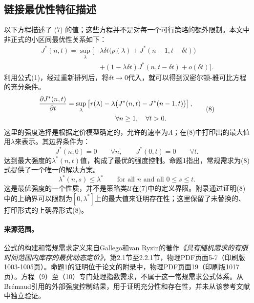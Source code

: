\documentclass{article}
\begin{document}
\subsection*{链接最优性特征描述}
以下方程描述了 (7) 的值；这些方程并不是对每一个可行策略的额外限制。本文中非正式的小区间最优性关系如下：
\[
\begin{aligned}
J^*(n,t)=\sup_\lambda\bigl[&\lambda\delta t
 \bigl(p(\lambda)+J^*(n-1,t-\delta t)\bigr)\\
 &+(1-\lambda\delta t)J^*(n,t-\delta t)+o(\delta t)\bigr].
\end{aligned}
\]
利用公式(1)，经过重新排列后，将$\delta t\to0$代入，就可以得到汉密尔顿-雅可比方程的充分条件。
\begin{equation}
\begin{aligned}
\frac{\partial J^*(n,t)}{\partial t}
 &=\sup_\lambda\left[r(\lambda)-\lambda\bigl(J^*(n,t)-J^*(n-1,t)\bigr)\right],\\
 &\hspace{25mm}\forall n\geq1,\quad\forall t>0.
\end{aligned}
\tag{8}
\end{equation}
这里的强度选择是根据定价模型确定的，允许的速率为$\Lambda$；在(8)中打印出的最大值用$\lambda$来表示。其边界条件为：
\[
J^*(n,0)=0\qquad\forall n,
\qquad
J^*(0,t)=0\qquad\forall t.
\]
达到最大强度的$\lambda^*(n,t)$值，构成了最优的强度控制。命题1指出，常规需求为(8)式提供了一个唯一的解决方案。
\[
\lambda^*(n,s)\leq\lambda^*
\qquad\text{for all }n\text{ and all }0\leq s\leq t.
\]
这是最优强度的一个性质，并不是策略类$\mathcal U$在(7)中的定义界限。附录通过证明(8)中的上确界可以限制为$[0,\lambda^*]$上的最大值来证明存在性；这里保留了未替换的、打印形式的上确界形式(8)。

\paragraph{来源范围。}
公式的构建和常规需求定义来自Gallego和van Ryzin的著作\emph{《具有随机需求的有限时间范围内库存的最优动态定价》}，第2.1节至2.2.1节，物理PDF页面5-7（印刷版1003-1005页）。命题1的证明位于论文的附录中，物理PDF页面19（印刷版1017页）。方程（9）至（10）专门处理指数需求，不属于这一常规需求公式体系。从Br\'emaud引用的外部强度控制结果，用于证明充分性和存在性，并未从该参考文献中独立验证。
\end{document}
